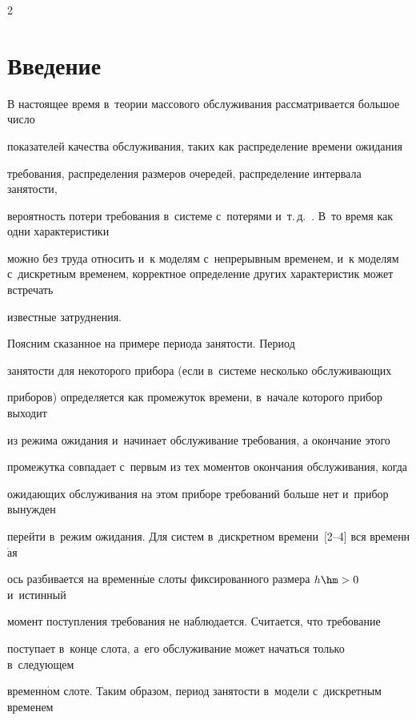 \begin{multicols}{2}



\label{st\stat}





\section{Введение}



В настоящее время в~теории массового обслуживания рассматривается большое число

показателей качества обслуживания, таких как распределение времени ожидания

требования, распределения размеров очередей, распределение интервала занятости,

вероятность потери требования в~системе с~потерями и~т.\,д.~\cite{Ivchenko:Kashtanov:Kovalenko}. В~то время как одни характеристики

можно без труда относить и~к моделям с~непрерывным временем, и~к моделям с~дискретным временем, корректное определение других характеристик может встречать

известные затруднения. 



Поясним сказанное на примере периода занятости. Период

за\-ня\-тости для некоторого прибора (если в~системе несколько обслуживающих

приборов) определяется как промежуток времени, в~начале которого прибор выходит

из режима ожидания и~начинает обслуживание требования, а окончание этого

промежутка совпадает с~первым из тех моментов окончания обслуживания, когда

ожидающих обслуживания на этом приборе требований больше нет и~прибор вынужден

перейти в~режим ожидания. Для систем в~дискретном времени~[2--4] вся временн$\acute{\mbox{а}}$я

ось разбивается на временн$\acute{\mbox{ы}}$е слоты фиксированного размера $h\hm>0$ и~истинный

момент поступления требования не наблюдается. Считается, что требование

поступает в~конце слота, а~его обслуживание может начаться только в~сле\-ду\-ющем

временн$\acute{\mbox{о}}$м слоте. Таким образом, период за\-ня\-тости в~модели с~дискретным временем


\end{multicols}
